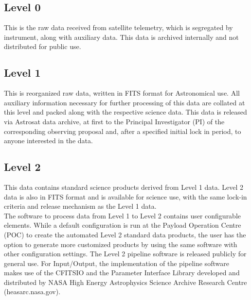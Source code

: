 \documentclass[11pt,oneside,a4paper]{article}
\begin{document}
\subsection*{Level 0}

This     is  the     raw     data    received    from    satellite   telemetry,  which   is  segregated  by 
instrument, along   with    auxiliary   data.   This    data   is  archived    internally  and not 
distributed   for public  use.

\subsection*{Level 1}

This   is  reorganized raw data,   written in  FITS    format  for Astronomical    use.    All auxiliary   
information necessary   for further processing  of  this    data   are  collated    at  this    level   and 
packed  along   with    the respective  science data.   This    data    is  released  via  Astrosat data
archive,   at  first   to  the     Principal   Investigator    (PI)    of  the     corresponding   observing  
proposal    and,    after   a   specified   initial lock    in  period, to  anyone  interested  in  the data.   

\subsection*{Level 2}

This     data    contains    standard    science     products    derived    from    Level   1   data.   Level   2  
data   is   also   in  FITS  format and is   available    for    science use,    with     the    same    
lock-in criteria    and release mechanism   as  the Level   1   data.\\


The  software    to  process     data    from    Level   1   to  Level   2  contains    user    configurable   
elements.        While   a   default     configuration   is  run   at  the     Payload     Operation   Centre 
(POC)   to  create  the automated   Level   2   standard data    products,   the user has   the option  to  
generate     more    customized  products    by  using   the     same    software    with    other  
configuration    settings.       The     Level   2   pipeline    software  is released publicly   for   general
use.      For Input/Output,   the implementation  of  the pipeline    software    makes   use of  
the  CFITSIO     and     the     Parameter   Interface   Library     developed   and     distributed     by  NASA   
High    Energy  Astrophysics  Science Archive Research    Centre  (heasarc.nasa.gov).\\ \\
\end{document}
